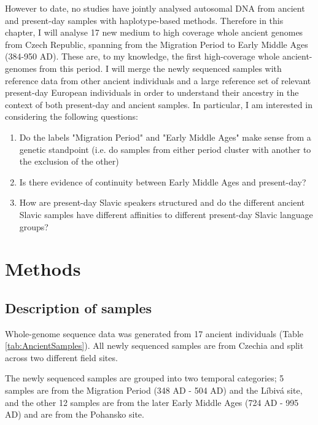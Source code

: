 However to date, no studies have jointly analysed autosomal DNA from ancient and present-day samples with haplotype-based methods. Therefore in this chapter, I will analyse 17 new medium to high coverage whole ancient genomes from Czech Republic, spanning from the Migration Period to Early Middle Ages (384-950 AD). These are, to my knowledge, the first high-coverage whole ancient-genomes from this period. I will merge the newly sequenced samples with reference data from other ancient individuals and a large reference set of relevant present-day European individuals in order to understand their ancestry in the context of both present-day and ancient samples. In particular, I am interested in considering the following questions:

\begin{enumerate}
\item Do the labels "Migration Period" and "Early Middle Ages" make sense from a genetic standpoint (i.e. do samples from either period cluster with another to the exclusion of the other)
\item Is there evidence of continuity between Early Middle Ages and present-day? 
\item How are present-day Slavic speakers structured and do the different ancient Slavic samples have different affinities to different present-day Slavic language groups?
\end{enumerate}


\section{Methods}

\subsection{Description of samples}

Whole-genome sequence data was generated from 17 ancient individuals (Table \ref{tab:AncientSamples}). All newly sequenced samples are from Czechia and split across two different field sites. 

The newly sequenced samples are grouped into two temporal categories; 5 samples are from the Migration Period (348 AD - 504 AD) and the Líbivá site, and the other 12 samples are from the later Early Middle Ages (724 AD - 995 AD) and are from the Pohansko site. 

